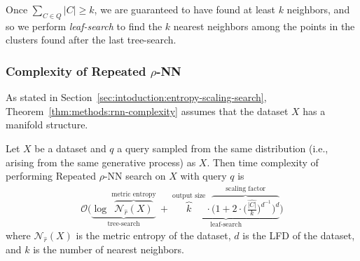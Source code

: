 Once $\sum_{C \in Q} |C| \geq k$, we are guaranteed to have found at least $k$ neighbors, and so we perform \textit{leaf-search} to find the $k$ nearest neighbors among the points in the clusters found after the last tree-search.


\subsubsection{Complexity of Repeated \texorpdfstring{$\rho$}{p}-NN}
\label{sec:methods:knn-search:repeated-rnn-complexity}


As stated in Section~\ref{sec:intoduction:entropy-scaling-search}, Theorem~\ref{thm:methods:rnn-complexity} assumes that the dataset $X$ has a manifold structure.


\begin{theorem} Let $X$ be a dataset and $q$ a query sampled from the same distribution (i.e., arising from the same generative process) as $X$. Then time complexity of performing Repeated $\rho$-NN search on $X$ with query $q$ is \begin{gather}
        \mathcal{O}
        \Bigg(
            \underbrace{
                \log~\overbrace{\mathcal{N}_{\hat{r}}(X)}^{\textrm{metric entropy}}
            }_{\textrm{tree-search}}
            \ + \
            \underbrace{
                \overbrace{k}^{\textrm{output size}} \cdot
                \overbrace{\bigg( 1 + 2 \cdot \Big( \frac{\hat{|C|}}{k} \Big) ^ {d^{-1}} \bigg)^d}^{\textrm{scaling factor}}
            }_{\textrm{leaf-search}}
        \Bigg)
        \label{eq:methods:repeated-rnn-complexity1}
    \end{gather}
    where $\mathcal{N}_{\hat{r}}(X)$ is the metric entropy of the dataset, $d$ is the LFD of the dataset, and $k$ is the number of nearest neighbors.
    \label{thm:methods:rnn-complexity}
\end{theorem}

